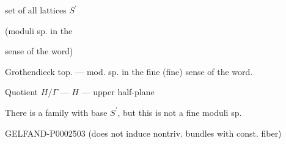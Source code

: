 set of all lattices $S^\prime$

(moduli sp. in the  sense of the word)

Grothendieck top. — mod. sp. in the fine (fine) sense of the word.





Quotient $H/\Gamma$ — $H$ — upper half-plane

There is a family with base $S^\prime$, but this is not a fine moduli sp.





\begin{GelfandAdjacentEvidence}{GELFAND-P000250}{3}
(does not induce nontriv. bundles with const. fiber)





\end{GelfandAdjacentEvidence}


